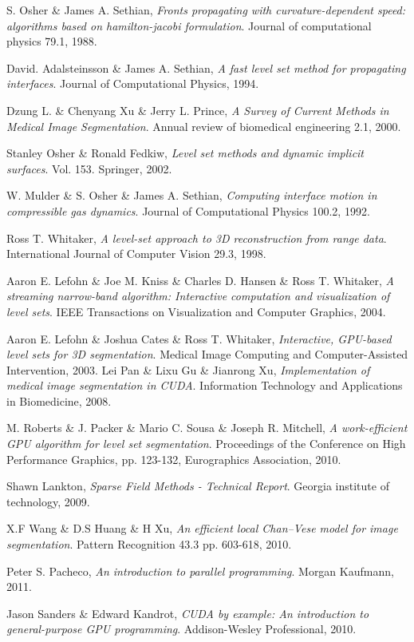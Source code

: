 \begin{thebibliography}{99}

	S. Osher \& James A. Sethian,
	\emph{Fronts propagating with curvature-dependent speed: algorithms based on hamilton-jacobi formulation}.
	Journal of computational physics 79.1,
	1988.
	
	David. Adalsteinsson \& James A. Sethian,
	\emph{A fast level set method for propagating interfaces}.
	Journal of Computational Physics,
	1994.

	Dzung L. \& Chenyang Xu \& Jerry L. Prince, 
	\emph{A Survey of Current Methods in Medical Image Segmentation}.
	Annual review of biomedical engineering 2.1,
	2000.

	Stanley Osher \& Ronald Fedkiw,
	\emph{Level set methods and dynamic implicit surfaces}.
	Vol. 153. Springer,
	2002.

	W. Mulder \& S. Osher \& James A. Sethian,
	\emph{Computing interface motion in compressible gas dynamics}.
	Journal of Computational Physics 100.2,
	1992.

	Ross T. Whitaker,
	\emph{A level-set approach to 3D reconstruction from range data}.
	International Journal of Computer Vision 29.3,
	1998.

	Aaron E. Lefohn \& Joe M. Kniss \& Charles D. Hansen \& Ross T. Whitaker,
	\emph{A streaming narrow-band algorithm: Interactive computation and visualization of level sets}.
	IEEE Transactions on Visualization and Computer Graphics,
	2004.

	Aaron E. Lefohn \& Joshua Cates \& Ross T. Whitaker,
	\emph{Interactive, GPU-based level sets for 3D segmentation}.
	 Medical Image Computing and Computer-Assisted Intervention,
	2003.
	Lei Pan \& Lixu Gu \& Jianrong Xu,
	\emph{Implementation of medical image segmentation in CUDA}.
	Information Technology and Applications in Biomedicine,
	2008.

	M. Roberts \& J. Packer \& Mario C. Sousa \& Joseph R. Mitchell,
	\emph{A work-efficient GPU algorithm for level set segmentation}.
	Proceedings of the Conference on High Performance Graphics, pp. 123-132, Eurographics Association,
	2010.

	Shawn Lankton,
	\emph{Sparse Field Methods - Technical Report}.
	Georgia institute of technology,
	2009.

	X.F Wang \& D.S Huang \& H Xu,
	\emph{An efficient local Chan–Vese model for image segmentation}.
	Pattern Recognition 43.3 pp. 603-618,
	2010.
	
	Peter S. Pacheco,
	\emph{An introduction to parallel programming}.
	Morgan Kaufmann,
	2011.

	Jason Sanders \& Edward Kandrot,
	\emph{CUDA by example: An introduction to general-purpose GPU programming}.
	Addison-Wesley Professional,
	2010.	
	

\end{thebibliography}
